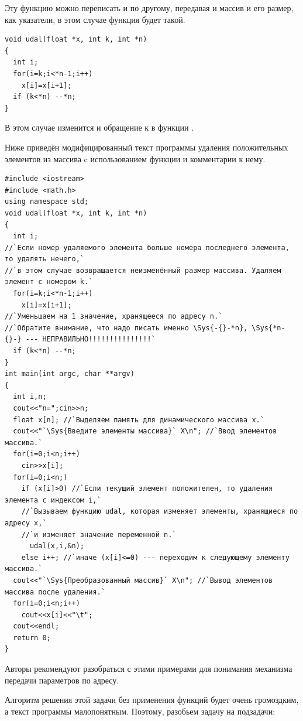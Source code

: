 Эту функцию можно переписать и по другому, передавая и массив и его размер, как указатели, в этом случае функция будет
такой.
\begin{lstlisting}
void udal(float *x, int k, int *n)
{
  int i;
  for(i=k;i<*n-1;i++)
    x[i]=x[i+1];
  if (k<*n) --*n;
}
\end{lstlisting}

В этом случае изменится и обращение к  в функции . 

Ниже приведён модифицированный текст программы удаления положительных элементов из массива  c
использованием функции  и комментарии к нему.
\begin{lstlisting}
#include <iostream>
#include <math.h>
using namespace std;
void udal(float *x, int k, int *n)
{
  int i;
//`Если номер удаляемого элемента больше номера последнего элемента, то удалять нечего,`
//`в этом случае возвращается неизменённый размер массива. Удаляем элемент с номером k.`
  for(i=k;i<*n-1;i++)
    x[i]=x[i+1];
//`Уменьшаем на 1 значение, хранящееся по адресу n.`
//`Обратите внимание, что надо писать именно \Sys{-{}-*n}, \Sys{*n-{}-} --- НЕПРАВИЛЬНО!!!!!!!!!!!!!!!`
  if (k<*n) --*n;
}
int main(int argc, char **argv)
{
  int i,n;
  cout<<"n=";cin>>n;
  float x[n]; //`Выделяем память для динамического массива x.`
  cout<<"`\Sys{Введите элементы массива}` X\n"; //`Ввод элементов массива.`
  for(i=0;i<n;i++)
    cin>>x[i];
  for(i=0;i<n;)
    if (x[i]>0) //`Если текущий элемент положителен, то удаления элемента с индексом i,` 
    //`Вызываем функцию udal, которая изменяет элементы, хранящиеся по адресу x,`
    //`и изменяет значение переменной n.`
      udal(x,i,&n);
    else i++; //`иначе (x[i]<=0) --- переходим к следующему элементу массива.`
  cout<<"`\Sys{Преобразованный массив}` X\n"; //`Вывод элементов массива после удаления.`
  for(i=0;i<n;i++)
    cout<<x[i]<<"\t";
  cout<<endl;
  return 0;
}
\end{lstlisting}

Авторы рекомендуют разобраться с этими примерами для понимания механизма передачи параметров по адресу.


Алгоритм решения этой задачи без применения функций будет очень громоздким, а текст программы малопонятным. Поэтому,
разобьем задачу на подзадачи:


